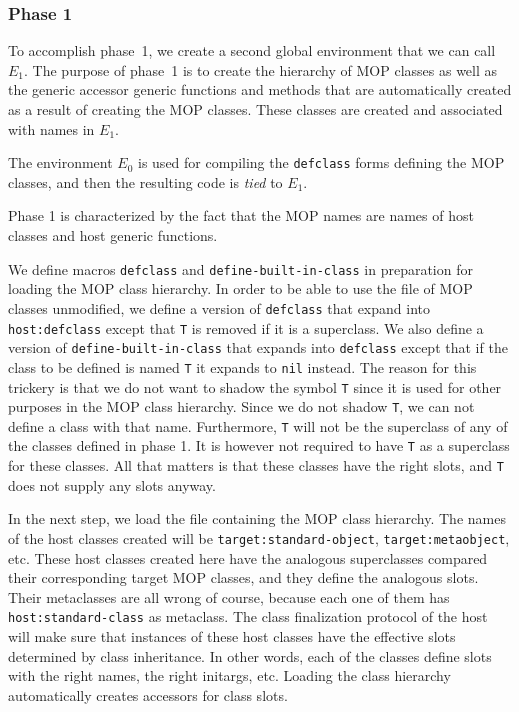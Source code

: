 \subsubsection{Phase 1}

To accomplish phase~1, we create a second \sysname{} global
environment that we can call $E_1$.  The purpose of phase~1 is to
create the hierarchy of MOP classes as well as the generic accessor
generic functions and methods that are automatically created as a
result of creating the MOP classes.  These classes are created and
associated with names in $E_1$.

The environment $E_0$ is used for compiling the \texttt{defclass}
forms defining the MOP classes, and then the resulting code is
\emph{tied} to $E_1$.

Phase 1 is characterized by the fact that the MOP names are names of
host classes and host generic functions.  

We define macros \texttt{defclass} and \texttt{define-built-in-class}
in preparation for loading the MOP class hierarchy.  In order to be
able to use the file of MOP classes unmodified, we define a version of
\texttt{defclass} that expand into \texttt{host:defclass} except that
\texttt{T} is removed if it is a superclass.  We also define a version
of \texttt{define-built-in-class} that expands into \texttt{defclass}
except that if the class to be defined is named \texttt{T} it expands
to \texttt{nil} instead.  The reason for this trickery is that we do
not want to shadow the symbol \texttt{T} since it is used for other
purposes in the MOP class hierarchy.  Since we do not shadow
\texttt{T}, we can not define a class with that name.  Furthermore,
\texttt{T} will not be the superclass of any of the classes defined in
phase 1.  It is however not required to have \texttt{T} as a
superclass for these classes.  All that matters is that these classes
have the right slots, and \texttt{T} does not supply any slots anyway.

In the next step, we load the file containing the MOP class hierarchy.
The names of the host classes created will be
\texttt{target:standard-object}, \texttt{target:metaobject}, etc.
These host classes created here have the analogous superclasses
compared their corresponding target MOP classes, and they define the
analogous slots.  Their metaclasses are all wrong of course, because
each one of them has \texttt{host:standard-class} as metaclass.  The
class finalization protocol of the host will make sure that instances
of these host classes have the effective slots determined by class
inheritance.  In other words, each of the classes define slots with
the right names, the right initargs, etc.  Loading the class hierarchy
automatically creates accessors for class slots. 

